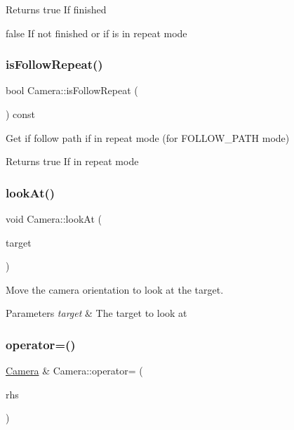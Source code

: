 \begin{DoxyReturn}{Returns}
true If finished 

false If not finished or if is in repeat mode 
\end{DoxyReturn}
\mbox{\label{class_camera_aadea4e3706e4a1405c7b035c60d6d69e}} 
\subsubsection{\texorpdfstring{is\+Follow\+Repeat()}{isFollowRepeat()}}
{\footnotesize\ttfamily bool Camera\+::is\+Follow\+Repeat (\begin{DoxyParamCaption}{ }\end{DoxyParamCaption}) const}



Get if follow path if in repeat mode (for F\+O\+L\+L\+O\+W\+\_\+\+P\+A\+TH mode) 

\begin{DoxyReturn}{Returns}
true If in repeat mode 
\end{DoxyReturn}
\mbox{\label{class_camera_a54c2f4e2c30c1fc0c82499982b59e6e0}} 
\subsubsection{\texorpdfstring{look\+At()}{lookAt()}}
{\footnotesize\ttfamily void Camera\+::look\+At (\begin{DoxyParamCaption}\item[{C\+A\+M\+E\+R\+A\+\_\+\+V\+E\+C3}]{target }\end{DoxyParamCaption})}



Move the camera orientation to look at the target. 


\begin{DoxyParams}{Parameters}
{\em target} & The target to look at \\
\hline
\end{DoxyParams}
\mbox{\label{class_camera_a7df2f4b79b58047d59902a2e8b40855d}} 
\subsubsection{\texorpdfstring{operator=()}{operator=()}}
{\footnotesize\ttfamily \hyperlink{class_camera}{Camera} \& Camera\+::operator= (\begin{DoxyParamCaption}\item[{\hyperlink{class_camera}{Camera} const \&}]{rhs }\end{DoxyParamCaption})}



